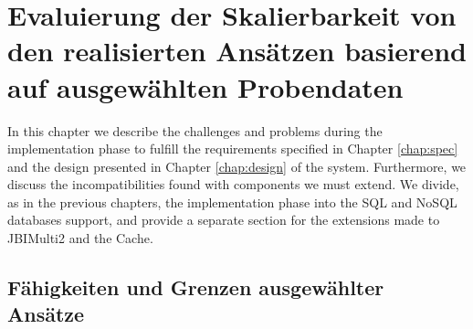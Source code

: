 \chapter{Evaluierung der Skalierbarkeit von den realisierten Ansätzen basierend auf ausgewählten Probendaten}
\label{chap:Evaluierung}

In this chapter we describe the challenges and problems during the implementation phase to fulfill the requirements specified in Chapter \ref{chap:spec} and the design presented in Chapter \ref{chap:design} of the system. Furthermore, we discuss the incompatibilities found with components we must extend. We divide, as in the previous chapters, the implementation phase into the \ac{SQL} and \ac{NoSQL} databases support, and provide a separate section for the extensions made to JBIMulti2 and the Cache. 
\section {Fähigkeiten und Grenzen ausgewählter Ansätze}
\label{sec:FGrenzen}


